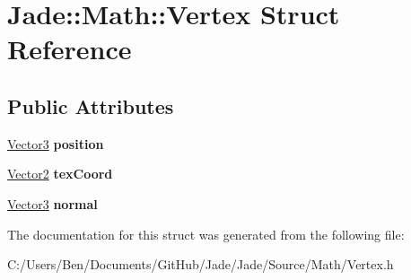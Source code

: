 \hypertarget{struct_jade_1_1_math_1_1_vertex}{}\section{Jade\+:\+:Math\+:\+:Vertex Struct Reference}
\label{struct_jade_1_1_math_1_1_vertex}
\subsection*{Public Attributes}
\begin{DoxyCompactItemize}
\item 
\hypertarget{struct_jade_1_1_math_1_1_vertex_a0dcd581ed4b39170c9bc8ab401c45cf1}{}\hyperlink{struct_jade_1_1_math_1_1_vector3}{Vector3} {\bfseries position}\label{struct_jade_1_1_math_1_1_vertex_a0dcd581ed4b39170c9bc8ab401c45cf1}

\item 
\hypertarget{struct_jade_1_1_math_1_1_vertex_a538c8da06e7c2fa7802ab773223ed61b}{}\hyperlink{struct_jade_1_1_math_1_1_vector2}{Vector2} {\bfseries tex\+Coord}\label{struct_jade_1_1_math_1_1_vertex_a538c8da06e7c2fa7802ab773223ed61b}

\item 
\hypertarget{struct_jade_1_1_math_1_1_vertex_a1fbe2d046b5b4f3b7f03e72838888294}{}\hyperlink{struct_jade_1_1_math_1_1_vector3}{Vector3} {\bfseries normal}\label{struct_jade_1_1_math_1_1_vertex_a1fbe2d046b5b4f3b7f03e72838888294}

\end{DoxyCompactItemize}


The documentation for this struct was generated from the following file\+:\begin{DoxyCompactItemize}
\item 
C\+:/\+Users/\+Ben/\+Documents/\+Git\+Hub/\+Jade/\+Jade/\+Source/\+Math/Vertex.\+h\end{DoxyCompactItemize}
